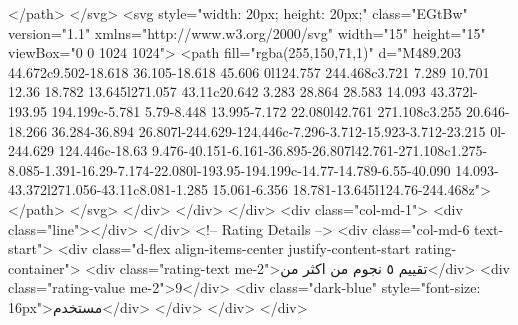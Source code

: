                     </path>
                  </svg>
                  <svg style="width: 20px; height: 20px;" class="EGtBw" version="1.1"
                    xmlns="http://www.w3.org/2000/svg" width="15" height="15" viewBox="0 0 1024 1024">
                    <path fill="rgba(255,150,71,1)"
                      d="M489.203 44.672c9.502-18.618 36.105-18.618 45.606 0l124.757 244.468c3.721 7.289 10.701 12.36 18.782 13.645l271.057 43.11c20.642 3.283 28.864 28.583 14.093 43.372l-193.95 194.199c-5.781 5.79-8.448 13.995-7.172 22.080l42.761 271.108c3.255 20.646-18.266 36.284-36.894 26.807l-244.629-124.446c-7.296-3.712-15.923-3.712-23.215 0l-244.629 124.446c-18.63 9.476-40.151-6.161-36.895-26.807l42.761-271.108c1.275-8.085-1.391-16.29-7.174-22.080l-193.95-194.199c-14.77-14.789-6.55-40.090 14.093-43.372l271.056-43.11c8.081-1.285 15.061-6.356 18.781-13.645l124.76-244.468z">
                    </path>
                  </svg>
                </div>
              </div>
            </div>
            <div class="col-md-1">
              <div class="line"></div>
            </div>
            <!-- Rating Details -->
            <div class="col-md-6 text-start">
              <div class="d-flex align-items-center justify-content-start rating-container">
                <div class="rating-text me-2">تقييم ٥ نجوم من اكثر من</div>
                <div class="rating-value me-2">9</div>
                <div class="dark-blue" style="font-size: 16px">مستخدم</div>
              </div>
            </div>
          </div>

